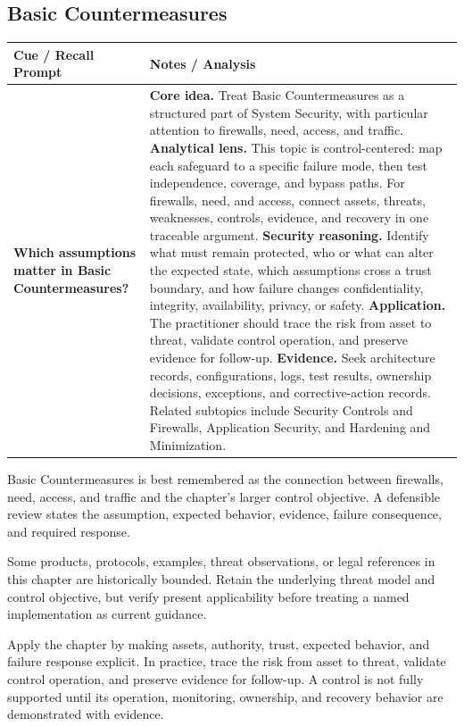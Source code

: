 \documentclass[11pt]{article}
\newcommand{\CornellHeader}{%
\rowcolor{Navy}\color{white}\bfseries Cue / Recall Prompt & \color{white}\bfseries Notes / Analysis\\\hline}
\newcommand{\CornellRow}[2]{%
\cellcolor{CueGray}\RaggedRight\textbf{#1} & \RaggedRight #2\\\hline}
\begin{document}
\subsection*{Basic Countermeasures}
\begin{longtable}{>{\RaggedRight\arraybackslash}p{}|>{\RaggedRight\arraybackslash}p{}}
\CornellHeader
\CornellRow{Which assumptions matter in Basic Countermeasures?}{\textbf{Core idea.} Treat Basic Countermeasures as a structured part of System Security, with particular attention to firewalls, need, access, and traffic. \textbf{Analytical lens.} This topic is control-centered: map each safeguard to a specific failure mode, then test independence, coverage, and bypass paths. For firewalls, need, and access, connect assets, threats, weaknesses, controls, evidence, and recovery in one traceable argument. \textbf{Security reasoning.} Identify what must remain protected, who or what can alter the expected state, which assumptions cross a trust boundary, and how failure changes confidentiality, integrity, availability, privacy, or safety. \textbf{Application.} The practitioner should trace the risk from asset to threat, validate control operation, and preserve evidence for follow-up. \textbf{Evidence.} Seek architecture records, configurations, logs, test results, ownership decisions, exceptions, and corrective-action records. Related subtopics include Security Controls and Firewalls, Application Security, and Hardening and Minimization.}
\end{longtable}
\begin{topicsummary}
Basic Countermeasures is best remembered as the connection between firewalls, need, access, and traffic and the chapter's larger control objective. A defensible review states the assumption, expected behavior, evidence, failure consequence, and required response.
\end{topicsummary}
\begin{historybox}
Some products, protocols, examples, threat observations, or legal references in this chapter are historically bounded. Retain the underlying threat model and control objective, but verify present applicability before treating a named implementation as current guidance.
\end{historybox}
\begin{defensebox}
Apply the chapter by making assets, authority, trust, expected behavior, and failure response explicit. In practice, trace the risk from asset to threat, validate control operation, and preserve evidence for follow-up. A control is not fully supported until its operation, monitoring, ownership, and recovery behavior are demonstrated with evidence.
\end{defensebox}
\end{document}
